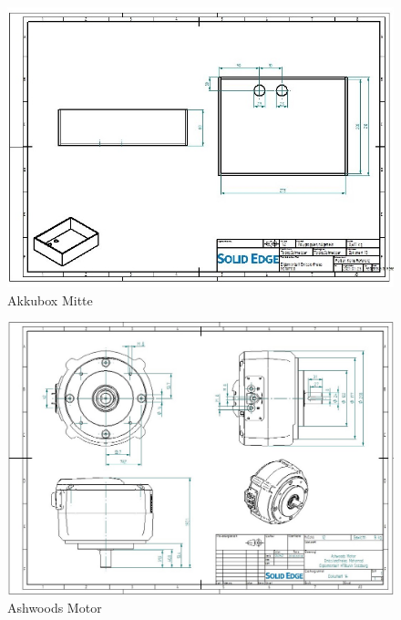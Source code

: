 \begin{figure} [H]
	\begin{center}
		\includegraphics[angle=90]{figures/mechanik/Box_3_Zeichnung.jpg}
		\caption{Akkubox Mitte}
		\label{fig:Akkubox Mitte}
	\end{center}
\end{figure}

\begin{figure} [H]
	\begin{center}
		\includegraphics[angle=90, width=\textwidth]{figures/antrieb/Ashwoods_CAD.jpg}
		\caption{Ashwoods Motor}
		\label{Ashwoods_CAD}
	\end{center}
\end{figure}

